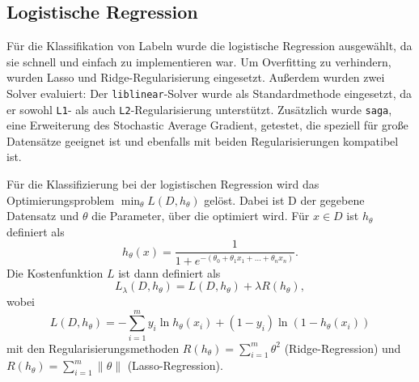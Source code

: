 \subsection{Logistische Regression}
\label{sec:logreg}

Für die Klassifikation von Labeln wurde die logistische Regression ausgewählt, da sie schnell und einfach zu implementieren war. Um Overfitting zu verhindern, wurden Lasso und Ridge-Regularisierung eingesetzt. Außerdem wurden zwei Solver evaluiert: Der \texttt{liblinear}-Solver wurde als Standardmethode eingesetzt, da er sowohl \texttt{L1}- als auch \texttt{L2}-Regularisierung unterstützt. Zusätzlich wurde \texttt{saga}, eine Erweiterung des Stochastic Average Gradient, getestet, die speziell für große Datensätze geeignet ist und ebenfalls mit beiden Regularisierungen kompatibel ist.

Für die Klassifizierung bei der logistischen Regression wird das Optimierungsproblem $\min_\theta L(D,h_\theta)$ gelöst. Dabei ist D der gegebene Datensatz und $\theta$ die Parameter, über die optimiert wird. Für $x \in D$ ist $h_\theta$ definiert als
\begin{equation*}
    h_\theta(x) = \frac{1}{1 + e^{-(\theta_0 + \theta_1 x_1 + \dots + \theta_n x_n)}}.
\end{equation*}
Die Kostenfunktion $L$ ist dann definiert als
\begin{equation*}
    L_\lambda(D, h_\theta)=L(D,h_\theta)+\lambda R(h_\theta),
\end{equation*}
wobei
\begin{equation*}
    L(D,h_\theta)=- \sum_{i=1}^{m}  y_i \ln h_\theta(x_i) + (1 - y_i) \ln (1 - h_\theta(x_i))
\end{equation*}
mit den Regularisierungsmethoden $R(h_\theta)=\sum_{i=1}^m\theta^2$ (Ridge-Regression) und $ R(h_\theta)=\sum_{i=1}^m\|\theta\|$ (Lasso-Regression).
